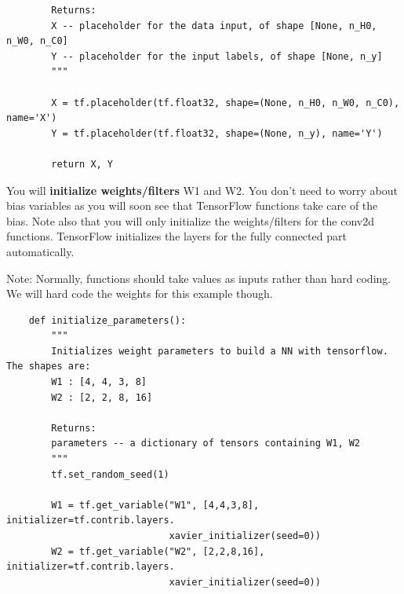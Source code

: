 \documentclass[11pt, a4paper]{article}
\begin{document}
\begin{spacing}{1.1}
\begin{lstlisting}
		Returns:
		X -- placeholder for the data input, of shape [None, n_H0, n_W0, n_C0] 
		Y -- placeholder for the input labels, of shape [None, n_y] 
		"""
		
		X = tf.placeholder(tf.float32, shape=(None, n_H0, n_W0, n_C0), name='X')
		Y = tf.placeholder(tf.float32, shape=(None, n_y), name='Y')
			
		return X, Y \end{lstlisting} \vspace*{1mm}
	You will \textbf{initialize weights/filters} W1 and W2. You don't need to worry about bias variables as you will soon see that TensorFlow functions take care of the bias. Note also that you will only initialize the weights/filters for the conv2d functions. TensorFlow initializes the layers for the fully connected part automatically. \newpage

	\noindent Note: Normally, functions should take values as inputs rather than hard coding. We will hard code the weights for this example though.
	\begin{lstlisting}
	def initialize_parameters():
		"""
		Initializes weight parameters to build a NN with tensorflow. The shapes are:
		W1 : [4, 4, 3, 8]
		W2 : [2, 2, 8, 16]
		
		Returns:
		parameters -- a dictionary of tensors containing W1, W2
		"""
		tf.set_random_seed(1)
		
		W1 = tf.get_variable("W1", [4,4,3,8], initializer=tf.contrib.layers.
		                     xavier_initializer(seed=0))
		W2 = tf.get_variable("W2", [2,2,8,16], initializer=tf.contrib.layers.
		                     xavier_initializer(seed=0))
		

\end{lstlisting}
\end{spacing}
\end{document}
